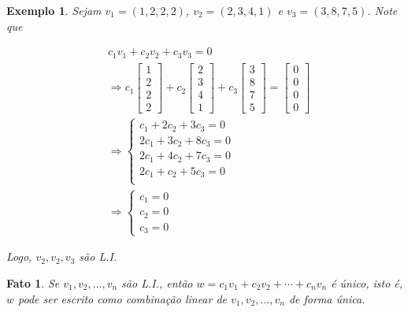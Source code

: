 \documentclass{article}
\newtheorem*{fact}{Fato}
\newtheorem*{example}{Exemplo}
\begin{document}
\begin{example}
	Sejam $v_1 = (1, 2, 2, 2)$, $v_2 = (2, 3, 4, 1)$ e $v_3 = (3, 8, 7, 5)$. Note que
	
	\begin{align*}
	&c_1v_1 + c_2v_2 + c_3v_3 = 0 \\
	&\Rightarrow c_1\begin{bmatrix}
	1\\
	2\\
	2\\
	2
	\end{bmatrix} + c_2\begin{bmatrix}
	2\\
	3\\
	4\\
	1
	\end{bmatrix} + c_3\begin{bmatrix}
	3\\
	8\\
	7\\
	5
	\end{bmatrix} = \begin{bmatrix}
	0\\
	0\\
	0\\
	0
	\end{bmatrix}\\
	&\Rightarrow 
	\begin{cases}
	c_1 + 2c_2 + 3c_3 = 0 \\
	2c_1 + 3c_2 + 8c_3 = 0 \\
	2c_1 + 4c_2 + 7c_3 = 0 \\
	2c_1 + c_2 + 5c_3 = 0 \\
	\end{cases}	\\
	&\Rightarrow \begin{cases}
	c_1 = 0 \\
	c_2 = 0 \\
	c_3 = 0
	\end{cases}
	\end{align*}
	\par\vspace{0.3cm} Logo, $v_2, v_2, v_3$ são L.I.
\end{example}

\begin{fact}
	Se $v_1, v_2, \dots, v_n$ são L.I., então $w = c_1v_1 + c_2v_2 + \cdots + c_nv_n$ é único, isto é, $w$ pode ser escrito como combinação linear de $v_1, v_2, \dots, v_n$ de forma única.
\end{fact}
\end{document}
